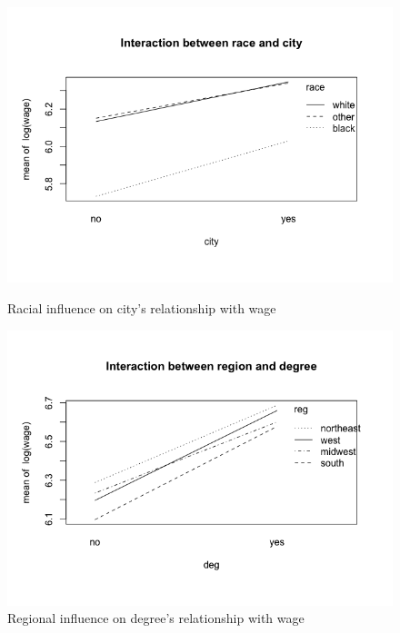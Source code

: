 \documentclass{article}
\begin{document}
\begin{figure}
\begin{minipage}{.45\textwidth}
          \includegraphics[scale=0.35]{interaction/racecity}
          \caption{Racial influence on city's relationship with wage}
          \label{fig:interactionracecity}
        \end{minipage}
        \begin{minipage}{.45\textwidth}
          \centering
          \includegraphics[scale=0.35]{interaction/degreeregion}
          \caption{Regional influence on degree's relationship with wage}
          \label{fig:interactionregiondegree}


\end{minipage}
\end{figure}
\end{document}
